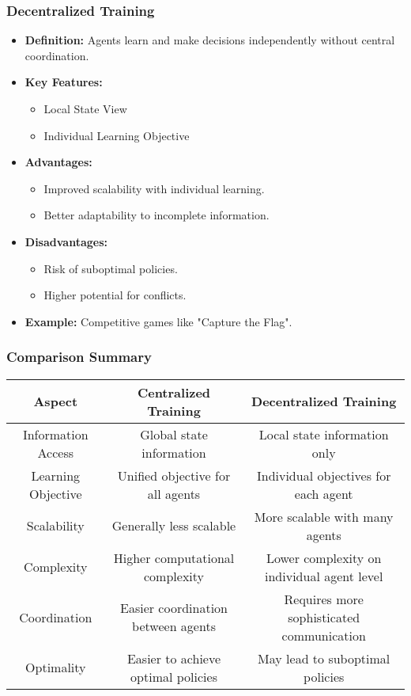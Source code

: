 \documentclass[aspectratio=169]{beamer}
\begin{document}
\begin{frame}
    \frametitle{Decentralized Training}
    \begin{itemize}
        \item \textbf{Definition:} Agents learn and make decisions independently without central coordination.
        \item \textbf{Key Features:}
            \begin{itemize}
                \item Local State View
                \item Individual Learning Objective
            \end{itemize}
        \item \textbf{Advantages:}
            \begin{itemize}
                \item Improved scalability with individual learning.
                \item Better adaptability to incomplete information.
            \end{itemize}
        \item \textbf{Disadvantages:}
            \begin{itemize}
                \item Risk of suboptimal policies.
                \item Higher potential for conflicts.
            \end{itemize}
        \item \textbf{Example:} Competitive games like "Capture the Flag".
    \end{itemize}
\end{frame}

\begin{frame}
    \frametitle{Comparison Summary}
    \begin{center}
        \begin{tabular}{|c|c|c|}
            \hline
            \textbf{Aspect} & \textbf{Centralized Training} & \textbf{Decentralized Training} \\
            \hline
            Information Access & Global state information & Local state information only \\
            Learning Objective & Unified objective for all agents & Individual objectives for each agent \\
            Scalability & Generally less scalable & More scalable with many agents \\
            Complexity & Higher computational complexity & Lower complexity on individual agent level \\
            Coordination & Easier coordination between agents & Requires more sophisticated communication \\
            Optimality & Easier to achieve optimal policies & May lead to suboptimal policies \\
            \hline
        \end{tabular}
    \end{center}
\end{frame}
\end{document}
